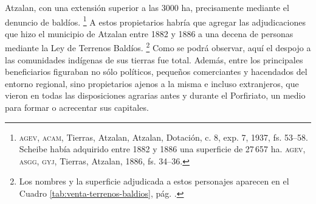 \documentclass[14pt,twoside,final]{extbook} %
\let\oldfootnote\footnote
\renewcommand\footnote[1]{%
\oldfootnote{\hspace{1mm}#1}}
\begin{document}
Atzalan, con una extensión superior a las 3000 ha, precisamente mediante el denuncio de baldíos.\footnote{\textsc{agev, acam}, Tierras, Atzalan, Atzalan, Dotación, c. 8, exp. 7, 1937, fs. 53--58. Scheibe\index[nombres]{Scheibe, Gustavo} había adquirido entre 1882 y 1886 una superficie de 27\,657 ha. \textsc{agev, asgg, gyj}, Tierras, Atzalan, 1886, fs. 34--36.} A estos propietarios habría que agregar las adjudicaciones que hizo el municipio de Atzalan entre 1882 y 1886 a una decena de personas mediante la Ley de Terrenos Baldíos.\footnote{Los nombres y la superficie adjudicada a estos personajes aparecen en el Cuadro  \ref{tab:venta-terrenos-baldios}, pág. \pageref{tab:venta-terrenos-baldios}.} Como se podrá observar, aquí el despojo a las comunidades indígenas de sus tierras fue total. Además, entre los principales beneficiarios figuraban no sólo políticos, pequeños comerciantes y hacendados del entorno regional, sino propietarios ajenos a la misma e incluso extranjeros, que vieron en todas las disposiciones agrarias antes y durante el Porfiriato, un medio para formar o acrecentar sus capitales.
\end{document}

